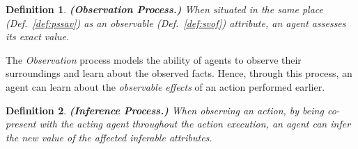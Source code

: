 \documentclass[letterpaper]{article} %
\newtheorem{definition}{Definition}
\begin{document}
\begin{definition} 
\label{def:obs}
    \textbf{(Observation Process.)} When situated in the same place (Def.~\ref{def:pssav}) as an observable (Def.~\ref{def:svof}) attribute, an agent assesses its exact value.  
\end{definition}



The \textit{Observation} process models the ability of agents to observe their surroundings and 
learn about
the observed facts. Hence, through this process, an agent can learn about the \textit{observable effects} of an action performed earlier. 



\begin{definition} \label{def:inf}
    \textbf{(Inference Process.)} When observing an action, by being co-present with the acting agent throughout the action execution, an agent can infer the new value of the affected inferable attributes.  
\end{definition}
\end{document}
